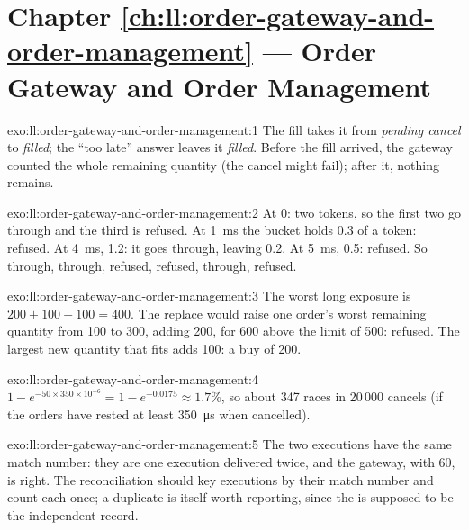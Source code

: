 \section*{Chapter \ref{ch:ll:order-gateway-and-order-management} --- Order Gateway and Order Management}

\begin{solution}{exo:ll:order-gateway-and-order-management:1}
The fill takes it from \emph{pending cancel} to \emph{filled}; the ``too late'' answer leaves it \emph{filled}. Before the fill
arrived, the gateway counted the whole remaining quantity (the cancel might fail); after it, nothing remains.
\end{solution}

\begin{solution}{exo:ll:order-gateway-and-order-management:2}
At 0: two tokens, so the first two go through and the third is refused. At \qty{1}{\milli\second} the bucket holds 0.3 of a
token: refused. At \qty{4}{\milli\second}, 1.2: it goes through, leaving 0.2. At \qty{5}{\milli\second}, 0.5: refused. So
through, through, refused, refused, through, refused.
\end{solution}

\begin{solution}{exo:ll:order-gateway-and-order-management:3}
The worst long exposure is $200 + 100 + 100 = 400$. The replace would raise one order's worst remaining quantity from 100 to
300, adding 200, for 600 above the limit of 500: refused. The largest new quantity that fits adds 100: a buy of 200.
\end{solution}

\begin{solution}{exo:ll:order-gateway-and-order-management:4}
$1 - e^{-50 \times 350 \times 10^{-6}} = 1 - e^{-0.0175} \approx 1.7\%$, so about 347 races in 20\,000 cancels (if the orders
have rested at least \qty{350}{\micro\second} when cancelled).
\end{solution}

\begin{solution}{exo:ll:order-gateway-and-order-management:5}
The two executions have the same match number: they are one execution delivered twice, and the gateway, with 60, is right.
The reconciliation should key executions by their match number and count each once; a duplicate is itself worth reporting,
since the  is supposed to be the independent record.
\end{solution}

